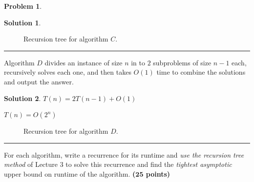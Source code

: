 \documentclass{article}
\theoremstyle{definition}
\newtheorem{problem}{Problem}
\def\fline{\rule{0.75\linewidth}{0.5pt}}
\newcommand{\finishline}{\begin{center}\fline\end{center}}
\newtheorem*{solution*}{Solution}
\newenvironment{solution}{\begin{solution*}}{{\finishline} \end{solution*}}
\newcommand{\grade}[1]{\hfill{\textbf{($\mathbf{#1}$ points)}}}
\begin{document}
\begin{problem}
\begin{enumerate}[label=(\Alph*)]
\begin{solution}
			\begin{figure}[h!]
			\centering
		\caption{Recursion tree for algorithm $C$.} 
		\end{figure}
\end{solution}

		\item Algorithm $D$ divides an instance of size $n$ in to $2$ subproblems of size $n-1$ each, recursively solves each one, and then takes $O(1)$ time to combine the solutions and output the answer. 
		
		    \begin{solution}
	\item $T(n) = 2T(n-1) + O(1)$
	\item $T(n) = O(2^n)$ 
	
			\begin{figure}[h!]
			\centering
		\caption{Recursion tree for algorithm $D$.} 
		\end{figure}
\end{solution}

	\end{enumerate}
	
	For each algorithm, write a recurrence for its runtime and \emph{use the recursion tree method} of Lecture 3 to solve this recurrence and find the \emph{tightest asymptotic} upper bound on runtime of the algorithm. \grade{25} 
\end{problem}
\end{document}
